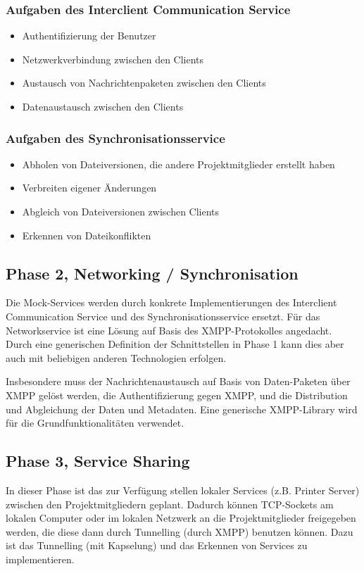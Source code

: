 \subsubsection{Aufgaben des Interclient Communication Service}
\begin{itemize}
\item Authentifizierung der Benutzer
\item Netzwerkverbindung zwischen den Clients
\item Austausch von Nachrichtenpaketen zwischen den Clients
\item Datenaustausch zwischen den Clients
\end{itemize}
\subsubsection{Aufgaben des Synchronisationsservice}
\begin{itemize}
\item Abholen von Dateiversionen, die andere Projektmitglieder erstellt haben
\item Verbreiten eigener Änderungen
\item Abgleich von Dateiversionen zwischen Clients
\item Erkennen von Dateikonflikten
\end{itemize}
\subsection{Phase 2, Networking / Synchronisation}
Die Mock-Services werden durch konkrete Implementierungen des Interclient Communication Service und des Synchronisationsservice ersetzt. Für das Networkservice ist eine Lösung auf Basis des XMPP-Protokolles angedacht. Durch eine generischen Definition der Schnittstellen in Phase 1 kann dies aber auch mit beliebigen anderen Technologien erfolgen.


Insbesondere muss der Nachrichtenaustausch auf Basis von Daten-Paketen über XMPP gelöst werden, die Authentifizierung gegen XMPP, und die Distribution und Abgleichung der Daten und Metadaten. 
Eine generische XMPP-Library wird für die Grundfunktionalitäten verwendet.


\subsection{Phase 3, Service Sharing}
In dieser Phase ist das zur Verfügung stellen lokaler Services (z.B. Printer Server) zwischen den 
Projektmitgliedern geplant. Dadurch können TCP-Sockets am lokalen Computer oder im lokalen Netzwerk 
an die Projektmitglieder freigegeben werden, die diese dann durch Tunnelling (durch XMPP) benutzen
können. Dazu ist das Tunnelling (mit Kapselung) und das Erkennen von Services zu implementieren.


